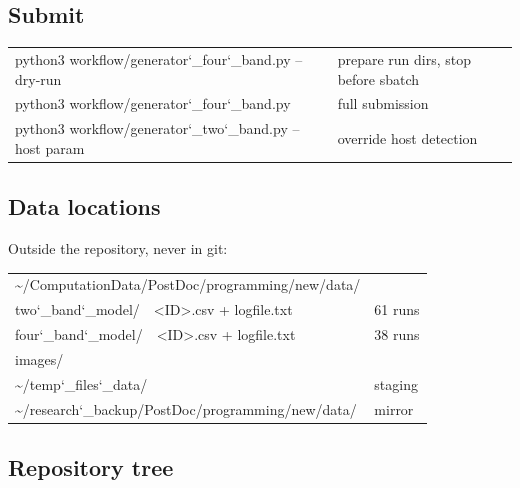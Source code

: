 \documentclass[11pt,a4paper]{article}
\newcommand{\brk}{\discretionary{}{}{}}
\newcommand{\uu}{\char`_\brk}
\newcommand{\fn}[1]{{\ttfamily #1}}
\begin{document}
\subsection{Submit}

\begin{center}\ttfamily\scriptsize
\begin{tabular}{@{}l l@{}}
python3 workflow/generator\uu four\uu band.py --dry-run & prepare run dirs, stop before \fn{sbatch} \\
python3 workflow/generator\uu four\uu band.py           & full submission \\
python3 workflow/generator\uu two\uu band.py --host param & override host detection \\
\end{tabular}
\end{center}

\subsection{Data locations}

Outside the repository, never in git:

\begin{center}\ttfamily\scriptsize
\begin{tabular}{@{}l l@{}}
\textasciitilde/ComputationData/PostDoc/programming/new/data/ & \\
\quad two\uu band\uu model/\ \ <ID>.csv + logfile.txt  & 61 runs \\
\quad four\uu band\uu model/\ \ <ID>.csv + logfile.txt & 38 runs \\
\quad images/ & \\
\textasciitilde/temp\uu files\uu data/ & staging \\
\textasciitilde/research\uu backup/PostDoc/programming/new/data/ & mirror \\
\end{tabular}
\end{center}

\subsection{Repository tree}
\end{document}
